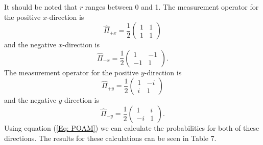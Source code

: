 \documentclass[twocolumn]{article}
\begin{document}
It should be noted that $r$ ranges between 0 and 1. The measurement operator for the positive $x$-direction is
\begin{equation} \label{Eq: SQ+X}
\hat{\Pi}_{+x}=\frac{1}{2}
\begin{pmatrix}
1 & 1 \\
1 & 1
\end{pmatrix}
\end{equation}
and the negative $x$-direction is
\begin{equation} \label{Eq: SQ-X}
\hat{\Pi}_{-x}=\frac{1}{2}
\begin{pmatrix}
1 & -1 \\
-1 & 1
\end{pmatrix}.
\end{equation}
The measurement operator for the positive $y$-direction is
\begin{equation} \label{Eq: SQ+Y}
\hat{\Pi}_{+y}=\frac{1}{2}
\begin{pmatrix}
1 & -i \\
i & 1
\end{pmatrix}
\end{equation}
and the negative $y$-direction is
\begin{equation} \label{Eq: SQ-Y}
\hat{\Pi}_{-y}=\frac{1}{2}
\begin{pmatrix}
1 & i \\
-i & 1
\end{pmatrix}.
\end{equation}
Using equation (\ref{Eq: POAM}) we can calculate the probabilities for both of these directions. The results for these calculations can be seen in Table 7.
\end{document}
